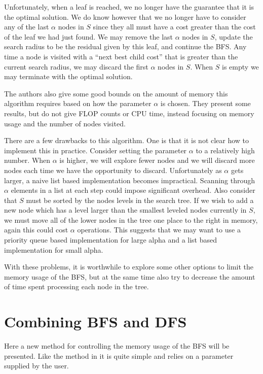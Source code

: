 \documentclass[12pt,Bold,letterpaper]{mcgilletdclass}
\begin{document}
Unfortunately, when a leaf is reached, we no longer have the guarantee that it is the optimal solution. We do know however that we no longer have to consider any of the last $\alpha$ nodes in $S$ since they all must have a cost greater than the cost of the leaf we had just found. We may remove the last $\alpha$ nodes in $S$, update the search radius to be the residual given by this leaf, and continue the BFS. Any time a node is visited with a ``next best child cost'' that is greater than the current search radius, we may discard the first $\alpha$ nodes in $S$. When $S$ is empty we may terminate with the optimal solution.

The authors also give some good bounds on the amount of memory this algorithm requires based on how the parameter $\alpha$ is chosen. They present some results, but do not give FLOP counts or CPU time, instead focusing on memory usage and the number of nodes visited.

There are a few drawbacks to this algorithm. One is that it is not clear how to implement this in practice. Consider setting the parameter $\alpha$ to a relatively high number. When $\alpha$ is higher, we will explore fewer nodes and we will discard more nodes each time we have the opportunity to discard. Unfortunately as $\alpha$ gets larger, a naive list based implementation becomes impractical. Scanning through $\alpha$ elements in a list at each step could impose significant overhead. Also consider that $S$ must be sorted by the nodes levels in the search tree. If we wish to add a new node which has a level larger than the smallest leveled nodes currently in $S$, we must move all of the lower nodes in the tree one place to the right in memory, again this could cost $\alpha$ operations. This suggests that we may want to use a priority queue based implementation for large alpha and a list based implementation for small alpha. 

With these problems, it is worthwhile to explore some other options to limit the memory usage of the BFS, but at the same time also try to decrease the amount of time spent processing each node in the tree.

\section{Combining BFS and DFS}

Here a new method for controlling the memory usage of the BFS will be presented. Like the method in \cite{StuBF07} it is quite simple and relies on a parameter supplied by the user.
\end{document}

